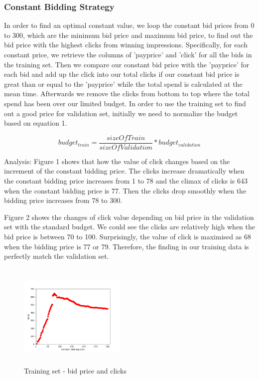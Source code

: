 \documentclass{sig-alternate-05-2015}
\begin{document}
\subsubsection{Constant Bidding Strategy}
In order to find an optimal constant value, we loop the constant bid prices from 0 to 300, which are the minimum bid price and maximum bid price, to find out the bid price with the highest clicks from winning impressions. Specifically, for each constant price, we retrieve the columns of 'payprice' and 'click' for all the bids in the training set. Then we compare our constant bid price with the 'payprice' for each bid and add up the click into our total clicks if our constant bid price is great than or equal to the 'payprice' while the total spend is calculated at the mean time. Afterwards we remove the clicks from bottom to top where the total spend has been over our limited budget.
In order to use the training set to find out a good price for validation set, initially we need to normalize the budget based on equation 1.

\begin{equation}budget_{train}=\frac{sizeOfTrain}{sizeOfValidation} * budget_{validation}\end{equation}

Analysis: 
Figure 1 shows that how the value of click changes based on the increment of the constant bidding price. The clicks increase dramatically when the constant bidding price increases from 1 to 78 and the climax of clicks is 643 when the constant bidding price is 77. Then the clicks drop smoothly when the bidding price increases from 78 to 300.


Figure 2 shows the changes of click value depending on bid price in the validation set with the standard budget. We could see the clicks are relatively high when the bid price is between 70 to 100. Surprisingly, the value of click is maximised as 68 when the bidding price is 77 or 79. Therefore, the finding in our training data is perfectly match the validation set.

\begin{figure}
\centering
\includegraphics[height=2in, width=2in]{images/constant_bidding.png}
\caption{Training set - bid price and clicks}
\end{figure}
\end{document}
